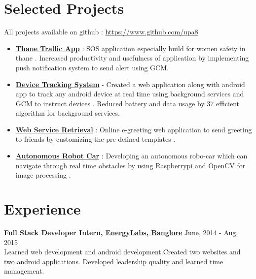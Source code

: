\documentclass[margin, centered]{res}
\begin{document}
\begin{resume}

\section{Selected Projects}
All projects available on github : \url{https://www.github.com/upa8}
\begin{itemize}[leftmargin=*]
 \item \textbf{\href{https://github.com/upa8/Thane-Traffic-App}{Thane Traffic App}} : SOS application especially build for women safety in thane . Increased productivity 
and usefulness of application by implementing push notification system to send alert using GCM.
 \item \textbf{\href{https://github.com/upa8/Device-Tracking-System}{Device Tracking System}} - Created a web application along with android app to track any android device at real 
time  using background services and GCM to instruct devices . Reduced battery and data usage by 37%
efficient algorithm for background services. 
 \item \textbf{\href{http://cupidic.com/}{Web Service Retrieval}} : 
 Online e-greeting web application to send greeting to friends by customizing the pre-defined 
templates . 
 \item \textbf{\href{https://github.com/upa8/Autonomous-Robot-Car}{Autonomous Robot Car}} : Developing an autonomous robo-car which can navigate through real time obstacles by using Raspberrypi and OpenCV for image processing . 
\end{itemize}

\section{Experience}
\textbf{Full Stack Developer Intern, \href{energylabs.in}{EnergyLabs, Banglore}} \hfill June, 2014 - Aug, 2015\\
  Learned web development and android development.Created two websites and two android applications. Developed leadership quality and learned time management. 
 \\


\end{resume}
\end{document}

